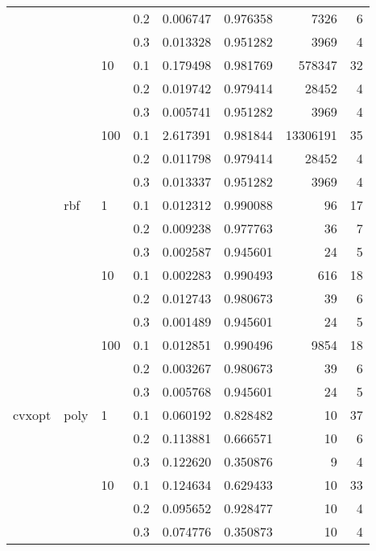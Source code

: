 \begin{table}[H]
\begin{tabular}{llllrrrr}
       &     &     & 0.2 &     0.006747 &  0.976358 &      7326 &     6 \\
       &     &     & 0.3 &     0.013328 &  0.951282 &      3969 &     4 \\
       &     & 10  & 0.1 &     0.179498 &  0.981769 &    578347 &    32 \\
       &     &     & 0.2 &     0.019742 &  0.979414 &     28452 &     4 \\
       &     &     & 0.3 &     0.005741 &  0.951282 &      3969 &     4 \\
       &     & 100 & 0.1 &     2.617391 &  0.981844 &  13306191 &    35 \\
       &     &     & 0.2 &     0.011798 &  0.979414 &     28452 &     4 \\
       &     &     & 0.3 &     0.013337 &  0.951282 &      3969 &     4 \\
       & rbf & 1   & 0.1 &     0.012312 &  0.990088 &        96 &    17 \\
       &     &     & 0.2 &     0.009238 &  0.977763 &        36 &     7 \\
       &     &     & 0.3 &     0.002587 &  0.945601 &        24 &     5 \\
       &     & 10  & 0.1 &     0.002283 &  0.990493 &       616 &    18 \\
       &     &     & 0.2 &     0.012743 &  0.980673 &        39 &     6 \\
       &     &     & 0.3 &     0.001489 &  0.945601 &        24 &     5 \\
       &     & 100 & 0.1 &     0.012851 &  0.990496 &      9854 &    18 \\
       &     &     & 0.2 &     0.003267 &  0.980673 &        39 &     6 \\
       &     &     & 0.3 &     0.005768 &  0.945601 &        24 &     5 \\
cvxopt & poly & 1   & 0.1 &     0.060192 &  0.828482 &        10 &    37 \\
       &     &     & 0.2 &     0.113881 &  0.666571 &        10 &     6 \\
       &     &     & 0.3 &     0.122620 &  0.350876 &         9 &     4 \\
       &     & 10  & 0.1 &     0.124634 &  0.629433 &        10 &    33 \\
       &     &     & 0.2 &     0.095652 &  0.928477 &        10 &     4 \\
       &     &     & 0.3 &     0.074776 &  0.350873 &        10 &     4 \\

\end{tabular}
\end{table}
